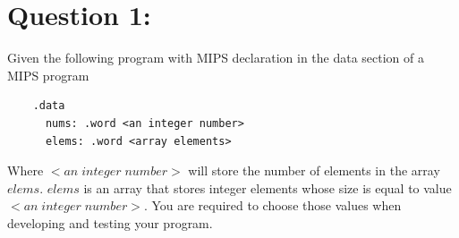 \documentclass[12pt,a4paper]{article}
\begin{document}
\begin{titlepage}
\begin{center}
\begin{minipage}{0.4\textwidth}
\begin{flushright}
      \end{flushright}
    \end{minipage}

    \vfill

    \vspace{2cm}
    {\large} %
  \end{center}
\end{titlepage}


\section*{Question 1:}
Given the following program with MIPS declaration in the data section of a MIPS program
\begin{mdframed}[hidealllines=true,backgroundcolor=magenta!10]
  \begin{lstlisting}
    .data
      nums: .word <an integer number>
      elems: .word <array elements>
  \end{lstlisting}
\end{mdframed}
Where \(<an\;integer\;number>\) will store the number of elements in the array \(elems\).
\(elems\) is an array that stores integer elements whose size is equal to value \(<an\;integer\;number>\).
You are required to choose those values when developing and testing your program.
\end{document}
